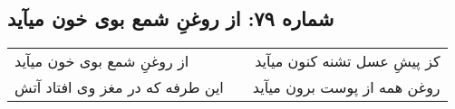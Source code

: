 \begin{center}
\section*{شماره ۷۹: از روغنِ شمع بوی خون میآید}
\label{sec:079}
\begin{longtable}{l p{0.5cm} r}
از روغنِ شمع بوی خون میآید
&&
کز پیشِ عسل تشنه کنون میآید
\\
این طرفه که در مغز وی افتاد آتش
&&
روغن همه از پوست برون میآید
\\
\end{longtable}
\end{center}
